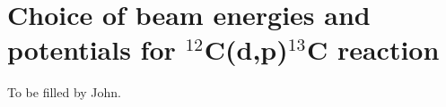 \section{Choice of beam energies and potentials for $^{12}$C(d,p)$^{13}$C reaction}
To be filled by John. 